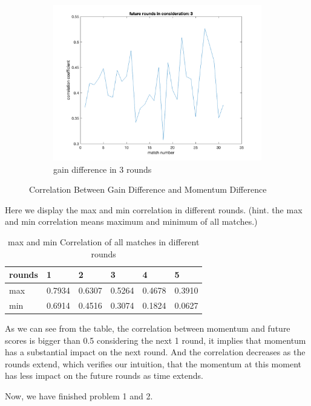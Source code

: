 \begin{figure}[H]
    \begin{subfigure}[b]{0.34\textwidth}
        \includegraphics[width=\linewidth]{mainmatter/photos/momen_3points_cor.png}
        \caption{gain difference in 3 rounds}
    \end{subfigure}
    \caption{Correlation Between Gain Difference and Momentum Difference}
    \label{fig:Correlation}
\end{figure}

Here we display the max and min correlation in different rounds.
(hint. the max and min correlation means maximum and minimum of all matches.)

\begin{table}[!ht]
    \centering
    \begin{tabular}{|l|l|l|l|l|l|}
    \hline
        rounds & 1 & 2 & 3 & 4 & 5 \\ \hline
        max & 0.7934 & 0.6307 & 0.5264 & 0.4678 & 0.3910 \\ \hline
        min & 0.6914 & 0.4516 & 0.3074 & 0.1824 & 0.0627 \\ \hline
    \end{tabular}
    \caption{max and min Correlation of all matches in different rounds}
    \label{fig:maxmin Correlation}
\end{table}

As we can see from the table, the correlation between momentum and future scores is bigger
than 0.5 considering the next 1 round, it implies that momentum has a substantial impact on the next round.
And the correlation decreases as the rounds extend, which verifies our intuition, that
the momentum at this moment has less impact on the future rounds as time extends.

Now, we have finished problem 1 and 2.